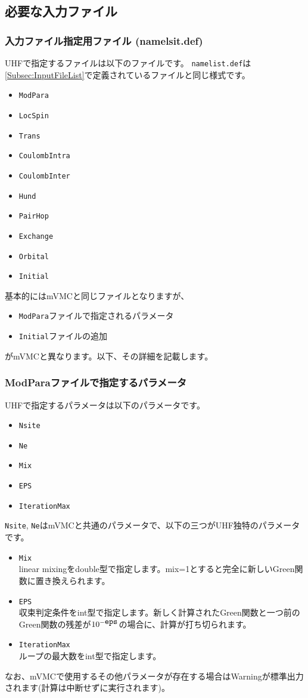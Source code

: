 \subsection{必要な入力ファイル}
\subsubsection{入力ファイル指定用ファイル (namelsit.def)}
UHFで指定するファイルは以下のファイルです。
\verb|namelist.def|は\ref{Subsec:InputFileList}で定義されているファイルと同じ様式です。\\
\begin{itemize}
\item{\verb|ModPara|}
\item{\verb|LocSpin|}
\item{\verb|Trans|}
\item{\verb|CoulombIntra|}
\item{\verb|CoulombInter|}
\item{\verb|Hund|}
\item{\verb|PairHop|}
\item{\verb|Exchange|}
\item{\verb|Orbital|}
\item{\verb|Initial|}
\end{itemize}
基本的にはmVMCと同じファイルとなりますが、
 \begin{itemize}
 \item{\verb|ModPara|ファイルで指定されるパラメータ}
 \item{\verb|Initial|ファイルの追加}
 \end{itemize}
がmVMCと異なります。以下、その詳細を記載します。


\subsubsection{ModParaファイルで指定するパラメータ}
UHFで指定するパラメータは以下のパラメータです。
\begin{itemize}
\item{\verb|Nsite|}
\item{\verb|Ne|}
\item{\verb|Mix|}
\item{\verb|EPS|}
\item{\verb|IterationMax|}
\end{itemize}
\verb|Nsite|, \verb|Ne|はmVMCと共通のパラメータで、以下の三つがUHF独特のパラメータです。
\begin{itemize}
\item{\verb|Mix|}\\
linear mixingをdouble型で指定します。mix=1とすると完全に新しいGreen関数に置き換えられます。
\item{\verb|EPS|}\\
収束判定条件をint型で指定します。新しく計算されたGreen関数と一つ前のGreen関数の残差が$10^{-\verb|eps|}$の場合に、計算が打ち切られます。
\item{\verb|IterationMax|}\\
ループの最大数をint型で指定します。
\end{itemize}
なお、mVMCで使用するその他パラメータが存在する場合はWarningが標準出力されます(計算は中断せずに実行されます)。

